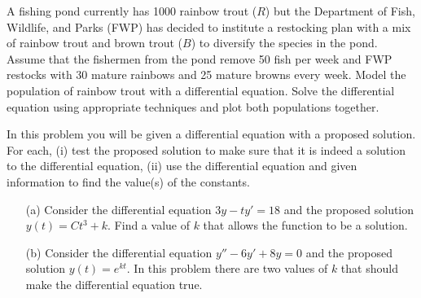 \begin{problem}
    A fishing pond currently has 1000 rainbow trout ($R$) but the Department of Fish,
    Wildlife, and Parks (FWP) has decided to institute a restocking plan with a mix of rainbow
    trout and brown trout ($B$) to diversify the species in the pond.  Assume that the
    fishermen from the pond remove 50 fish per week and FWP restocks with 30 mature
    rainbows and 25 mature browns every week.  Model the population of rainbow trout with
    a differential equation.  Solve the differential equation using appropriate
    techniques and plot both populations together.
\end{problem}


\begin{problem}
    In this problem you will be given a differential equation with a proposed solution.
    For each, (i) test the proposed solution to make sure that it is indeed a solution to
    the differential equation, (ii) use the differential equation and given information to
    find the value(s) of the constants.
    \begin{enumerate}
        \item[(a)] Consider the differential equation $3y - ty' = 18$ and the proposed
            solution $y(t) = C t^3 + k$.  Find a value of $k$ that allows the function to
            be a solution.  
        \item[(b)] Consider the differential equation $y'' - 6y' + 8y = 0$ and the
            proposed solution $y(t) = e^{kt}$.  In this problem there are two values of
            $k$ that should make the differential equation true.
    \end{enumerate}
\end{problem}


